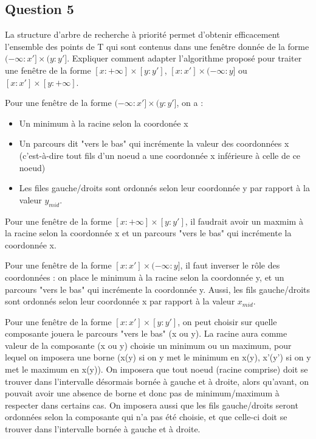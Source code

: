 \documentclass{article}
\newcommand{\gray}{\color{gray}}
\begin{document}
\newpage

\subsection{Question 5} La structure d'arbre de recherche à priorité permet d'obtenir efficacement l'ensemble
des points de T qui sont contenus dans une fenêtre donnée de la forme \\$(- \infty : x'] \times (y : y']$.
Expliquer comment adapter l'algorithme proposé pour traiter une fenêtre de la forme $[x : + \infty] \times [y : y']$,
$[x : x'] \times (- \infty : y]$ ou $[x : x'] \times [y : + \infty]$.


\bigskip

\gray
Pour une fenêtre de la forme $(- \infty : x'] \times (y : y']$, on a :
\begin{itemize}
    \item Un minimum à la racine selon la coordonée x
    \item Un parcours dit "vers le bas" qui incrémente la valeur des coordonnées x 
    (c'est-à-dire tout fils d'un noeud a une coordonnée x inférieure à celle de ce noeud)
    \item Les files gauche/droits sont ordonnés selon leur coordonnée y par rapport à la valeur $y_{mid}$.
\end{itemize}
Pour une fenêtre de la forme $[x : + \infty] \times [y : y']$, il faudrait avoir un maxmim à la racine selon la coordonnée x et un parcours "vers le bas" qui incrémente la coordonnée x. 

Pour une fenêtre de la forme $[x : x'] \times (- \infty : y]$, il faut inverser le rôle des coordonnées : on place le minimum à la racine selon la coordonnée y, et un parcours "vers le bas" qui
incrémente la coordonnée y. Aussi, les fils gauche/droits sont ordonnés selon leur coordonnée x par rapport à la valeur $x_{mid}$.

Pour une fenêtre de la forme $[x : x'] \times [y : y']$, on peut choisir sur quelle composante jouera le parcours "vers le bas" (x ou y). La racine aura comme valeur de la composante (x ou y) choisie
un minimum ou un maximum, pour lequel on imposera une borne (x(y) si on y met le minimum en x(y), x'(y') si on y met le maximum en x(y)). On imposera que tout noeud (racine comprise) doit se trouver dans l'intervalle désormais bornée
à gauche et à droite, alors qu'avant, on pouvait avoir une absence de borne et donc pas de minimum/maximum à respecter dans certains cas. On imposera aussi que les fils gauche/droits seront ordonnées selon la composante qui n'a
pas été choisie, et que celle-ci doit se trouver dans l'intervalle bornée à gauche et à droite.
\end{document}
